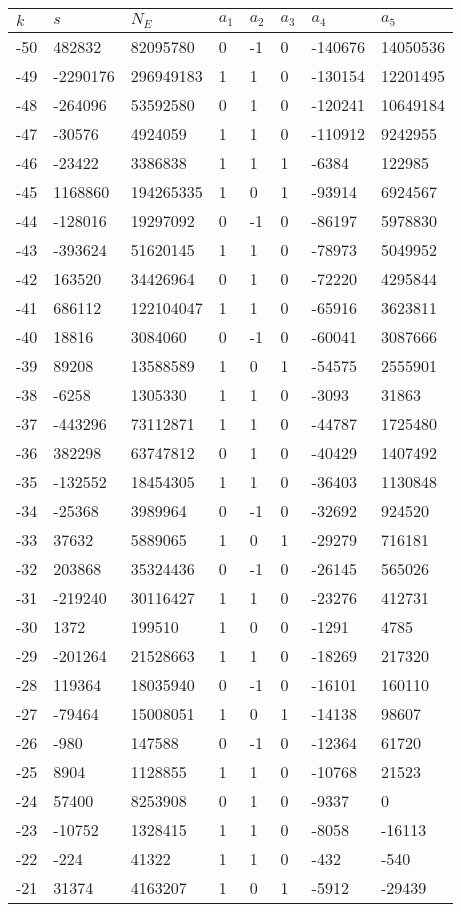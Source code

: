 \documentclass{amsart}
\begin{document}
\begin{longtable}{|l|l|l|lllll|}
\hline
$k$ & $s$ & $N_E$ & $a_1$ & $a_2$ & $a_3$ & $a_4$ & $a_5$\\
\hline
-50&482832&82095780&0&-1&0&-140676&14050536\\
-49&-2290176&296949183&1&1&0&-130154&12201495\\
-48&-264096&53592580&0&1&0&-120241&10649184\\
-47&-30576&4924059&1&1&0&-110912&9242955\\
-46&-23422&3386838&1&1&1&-6384&122985\\
-45&1168860&194265335&1&0&1&-93914&6924567\\
-44&-128016&19297092&0&-1&0&-86197&5978830\\
-43&-393624&51620145&1&1&0&-78973&5049952\\
-42&163520&34426964&0&1&0&-72220&4295844\\
-41&686112&122104047&1&1&0&-65916&3623811\\
-40&18816&3084060&0&-1&0&-60041&3087666\\
-39&89208&13588589&1&0&1&-54575&2555901\\
-38&-6258&1305330&1&1&0&-3093&31863\\
-37&-443296&73112871&1&1&0&-44787&1725480\\
-36&382298&63747812&0&1&0&-40429&1407492\\
-35&-132552&18454305&1&1&0&-36403&1130848\\
-34&-25368&3989964&0&-1&0&-32692&924520\\
-33&37632&5889065&1&0&1&-29279&716181\\
-32&203868&35324436&0&-1&0&-26145&565026\\
-31&-219240&30116427&1&1&0&-23276&412731\\
-30&1372&199510&1&0&0&-1291&4785\\
-29&-201264&21528663&1&1&0&-18269&217320\\
-28&119364&18035940&0&-1&0&-16101&160110\\
-27&-79464&15008051&1&0&1&-14138&98607\\
-26&-980&147588&0&-1&0&-12364&61720\\
-25&8904&1128855&1&1&0&-10768&21523\\
-24&57400&8253908&0&1&0&-9337&0\\
-23&-10752&1328415&1&1&0&-8058&-16113\\
-22&-224&41322&1&1&0&-432&-540\\
-21&31374&4163207&1&0&1&-5912&-29439\\

\end{longtable}
\end{document}
